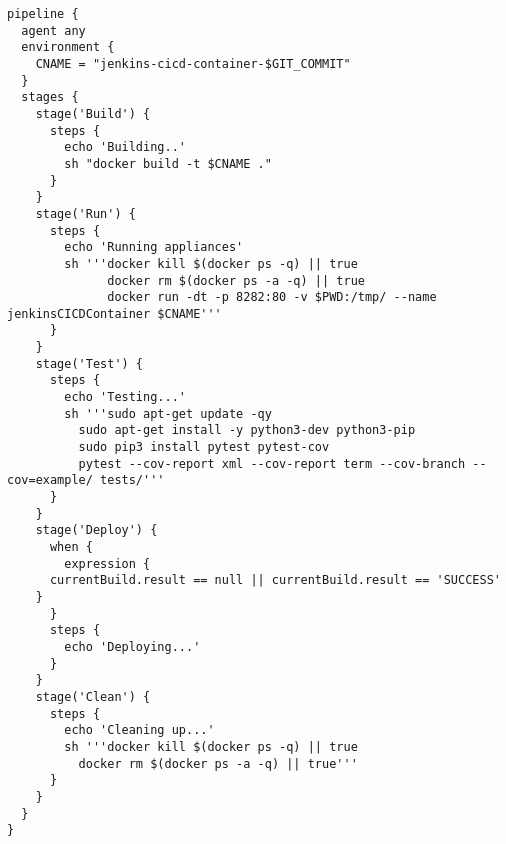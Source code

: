 \begin{lstlisting}[frame=single, basicstyle=\tiny]
pipeline {
  agent any
  environment {
    CNAME = "jenkins-cicd-container-$GIT_COMMIT"
  }
  stages {
    stage('Build') {
      steps {
        echo 'Building..'
        sh "docker build -t $CNAME ."
      }
    }
    stage('Run') {
      steps {
        echo 'Running appliances'
        sh '''docker kill $(docker ps -q) || true
              docker rm $(docker ps -a -q) || true
              docker run -dt -p 8282:80 -v $PWD:/tmp/ --name jenkinsCICDContainer $CNAME'''
      }
    }
    stage('Test') {
      steps {
        echo 'Testing...'
        sh '''sudo apt-get update -qy
	      sudo apt-get install -y python3-dev python3-pip
	      sudo pip3 install pytest pytest-cov
	      pytest --cov-report xml --cov-report term --cov-branch --cov=example/ tests/'''
      }
    }
    stage('Deploy') {
      when {
        expression {
	  currentBuild.result == null || currentBuild.result == 'SUCCESS'
	}
      }
      steps {
        echo 'Deploying...'
      }
    }
    stage('Clean') {
      steps {
        echo 'Cleaning up...'
        sh '''docker kill $(docker ps -q) || true
	      docker rm $(docker ps -a -q) || true'''
      }
    }
  }
}
\end{lstlisting}
